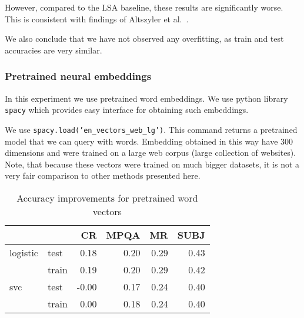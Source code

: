     However, compared to the LSA baseline, these results are significantly worse. 
    This is consistent with findings of Altszyler et al.~\cite{altszyler2016comparative}.
    
    We also conclude that we have not observed any overfitting, as train and test accuracies are very similar.
    

    \subsubsection{Pretrained neural embeddings}    
    
    In this experiment we use pretrained word embeddings. 
    We use python library \texttt{spacy} which provides easy interface for obtaining such embeddings.
    
    We use \texttt{spacy.load('en\_vectors\_web\_lg')}.
    This command returns a pretrained model that we can query with words. 
    Embedding obtained in this way have $300$ dimensions and were trained on a large web corpus (large collection of websites). 
    Note, that because these vectors were trained on much bigger datasets, it is not a very fair comparison to other methods presented here.

    \begin{table}[h]
    \begin{center}
    
    \begin{tabular}{llrrrr}
    \toprule
     &&CR &MPQA &MR &SUBJ \\
    \midrule
    logistic & test & 0.18 & 0.20 & 0.29 & 0.43 \\
     & train & 0.19 & 0.20 & 0.29 & 0.42 \\
    svc & test &-0.00 & 0.17 & 0.24 & 0.40 \\
     & train & 0.00 & 0.18 & 0.24 & 0.40 \\
    \bottomrule
    \end{tabular}
    
    \caption[Accuracy improvements for pretrained word vectors]{Accuracy improvements for pretrained word vectors}
    \label{tab:res:pretrainedwordvec}
    \end{center}
    \end{table}
    
